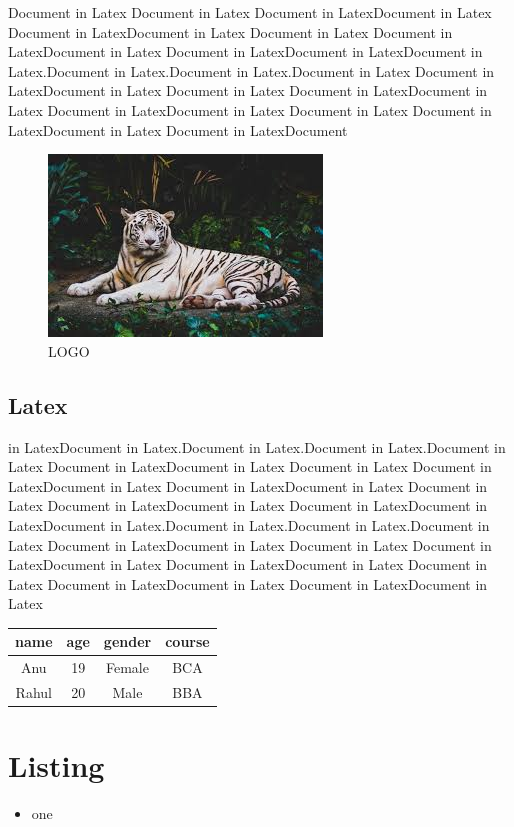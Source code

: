 \documentclass[12pt]{report} %
\begin{document}
\begin{multicols}{2}
Document in Latex Document in Latex Document in LatexDocument in Latex Document in LatexDocument in Latex Document in Latex Document in LatexDocument in Latex Document in LatexDocument in LatexDocument in Latex.Document in Latex.Document in Latex.Document in Latex Document 
in LatexDocument in Latex Document in Latex Document in LatexDocument in Latex Document in 
LatexDocument in Latex Document in Latex Document in LatexDocument in Latex Document in LatexDocument 
\begin{figure}[H]
\centering
\includegraphics{index.jpeg}
\caption{LOGO}
\end{figure}
\subsection{Latex}

in LatexDocument in Latex.Document in Latex.Document in Latex.Document in Latex Document in LatexDocument in Latex Document in Latex Document in LatexDocument in Latex Document in LatexDocument in Latex Document in Latex Document in LatexDocument in Latex Document in LatexDocument in LatexDocument in Latex.Document in Latex.Document in Latex.Document in Latex Document in LatexDocument in Latex Document in Latex Document in LatexDocument in Latex Document in LatexDocument in Latex Document in Latex Document in LatexDocument in Latex Document in LatexDocument in Latex



\begin{center}

\begin{tabular}{|c|c|c|c|}
\hline
name & age & gender & course   \\
\hline
Anu & 19	& Female & BCA \\
\hline
Rahul & 20 & Male & BBA\\
\hline
\end{tabular}

\end{center}

\section{Listing}
\begin{itemize}
\item one


\end{itemize}
\end{multicols}
\end{document}
